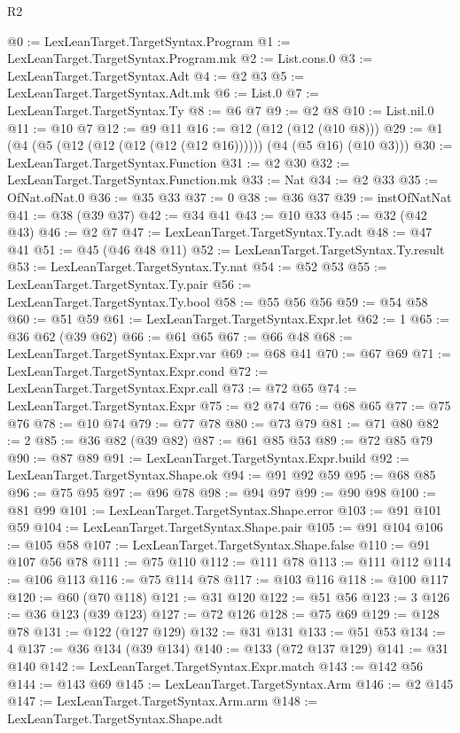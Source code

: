 \begin{lexlean}{R2}
\begin{coremodule}
@0 := LexLeanTarget.TargetSyntax.Program
@1 := LexLeanTarget.TargetSyntax.Program.mk
@2 := List.cons.{0}
@3 := LexLeanTarget.TargetSyntax.Adt
@4 := @2 @3
@5 := LexLeanTarget.TargetSyntax.Adt.mk
@6 := List.{0}
@7 := LexLeanTarget.TargetSyntax.Ty
@8 := @6 @7
@9 := @2 @8
@10 := List.nil.{0}
@11 := @10 @7
@12 := @9 @11
@16 := @12 (@12 (@12 (@10 @8)))
@29 := @1 (@4 (@5 (@12 (@12 (@12 (@12 (@12 @16)))))) (@4 (@5 @16) (@10 @3)))
@30 := LexLeanTarget.TargetSyntax.Function
@31 := @2 @30
@32 := LexLeanTarget.TargetSyntax.Function.mk
@33 := Nat
@34 := @2 @33
@35 := OfNat.ofNat.{0}
@36 := @35 @33
@37 := 0
@38 := @36 @37
@39 := instOfNatNat
@41 := @38 (@39 @37)
@42 := @34 @41
@43 := @10 @33
@45 := @32 (@42 @43)
@46 := @2 @7
@47 := LexLeanTarget.TargetSyntax.Ty.adt
@48 := @47 @41
@51 := @45 (@46 @48 @11)
@52 := LexLeanTarget.TargetSyntax.Ty.result
@53 := LexLeanTarget.TargetSyntax.Ty.nat
@54 := @52 @53
@55 := LexLeanTarget.TargetSyntax.Ty.pair
@56 := LexLeanTarget.TargetSyntax.Ty.bool
@58 := @55 @56 @56
@59 := @54 @58
@60 := @51 @59
@61 := LexLeanTarget.TargetSyntax.Expr.let
@62 := 1
@65 := @36 @62 (@39 @62)
@66 := @61 @65
@67 := @66 @48
@68 := LexLeanTarget.TargetSyntax.Expr.var
@69 := @68 @41
@70 := @67 @69
@71 := LexLeanTarget.TargetSyntax.Expr.cond
@72 := LexLeanTarget.TargetSyntax.Expr.call
@73 := @72 @65
@74 := LexLeanTarget.TargetSyntax.Expr
@75 := @2 @74
@76 := @68 @65
@77 := @75 @76
@78 := @10 @74
@79 := @77 @78
@80 := @73 @79
@81 := @71 @80
@82 := 2
@85 := @36 @82 (@39 @82)
@87 := @61 @85 @53
@89 := @72 @85 @79
@90 := @87 @89
@91 := LexLeanTarget.TargetSyntax.Expr.build
@92 := LexLeanTarget.TargetSyntax.Shape.ok
@94 := @91 @92 @59
@95 := @68 @85
@96 := @75 @95
@97 := @96 @78
@98 := @94 @97
@99 := @90 @98
@100 := @81 @99
@101 := LexLeanTarget.TargetSyntax.Shape.error
@103 := @91 @101 @59
@104 := LexLeanTarget.TargetSyntax.Shape.pair
@105 := @91 @104
@106 := @105 @58
@107 := LexLeanTarget.TargetSyntax.Shape.false
@110 := @91 @107 @56 @78
@111 := @75 @110
@112 := @111 @78
@113 := @111 @112
@114 := @106 @113
@116 := @75 @114 @78
@117 := @103 @116
@118 := @100 @117
@120 := @60 (@70 @118)
@121 := @31 @120
@122 := @51 @56
@123 := 3
@126 := @36 @123 (@39 @123)
@127 := @72 @126
@128 := @75 @69
@129 := @128 @78
@131 := @122 (@127 @129)
@132 := @31 @131
@133 := @51 @53
@134 := 4
@137 := @36 @134 (@39 @134)
@140 := @133 (@72 @137 @129)
@141 := @31 @140
@142 := LexLeanTarget.TargetSyntax.Expr.match
@143 := @142 @56
@144 := @143 @69
@145 := LexLeanTarget.TargetSyntax.Arm
@146 := @2 @145
@147 := LexLeanTarget.TargetSyntax.Arm.arm
@148 := LexLeanTarget.TargetSyntax.Shape.adt

\end{coremodule}
\end{lexlean}

